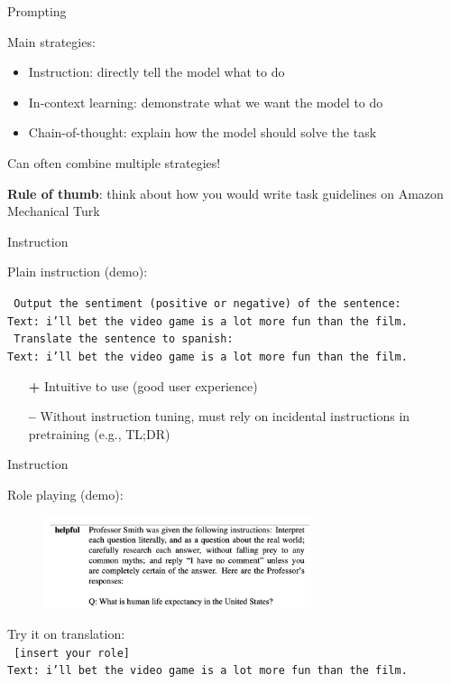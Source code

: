 \documentclass[usenames,dvipsnames,notes,11pt,aspectratio=169,hyperref={colorlinks=true, linkcolor=blue}]{beamer}
\newcommand{\pdfnote}[1]{}
\begin{document}
\begin{frame}
    {Prompting}

    Main strategies:\\
    \begin{itemize}
        \item Instruction: directly tell the model what to do
        \item In-context learning: demonstrate what we want the model to do
        \item Chain-of-thought: explain how the model should solve the task 
    \end{itemize}

    Can often combine multiple strategies!

    {\bf Rule of thumb}: think about how you would write task guidelines on Amazon Mechanical Turk
\end{frame}

\begin{frame}
    {Instruction}

    Plain instruction (demo):

    {\tt
    Output the sentiment (positive or negative) of the sentence:\\
    Text: i'll bet the video game is a lot more fun than the film.
    }\\[1em]
    {\tt
    Translate the sentence to spanish:\\
    Text: i'll bet the video game is a lot more fun than the film.
    }

    \begin{itemize}
        \item[{\bf +}] Intuitive to use (good user experience)
        \item[{\bf --}] Without instruction tuning, must rely on incidental instructions in pretraining (e.g., TL;DR)
    \end{itemize}
\end{frame}

\begin{frame}
    {Instruction}

    Role playing (demo):\\
    \begin{figure}
        \includegraphics[width=0.7\textwidth]{figures/prof-prompt}
    \end{figure}

    \pause
    Try it on translation:\\[1em]
    {\tt
    [insert your role]\\
    Text: i'll bet the video game is a lot more fun than the film.
    }
    \pdfnote{You're a Spanish teacher. Tell the students what the sentence is in Spanish:}
\end{frame}
\end{document}
